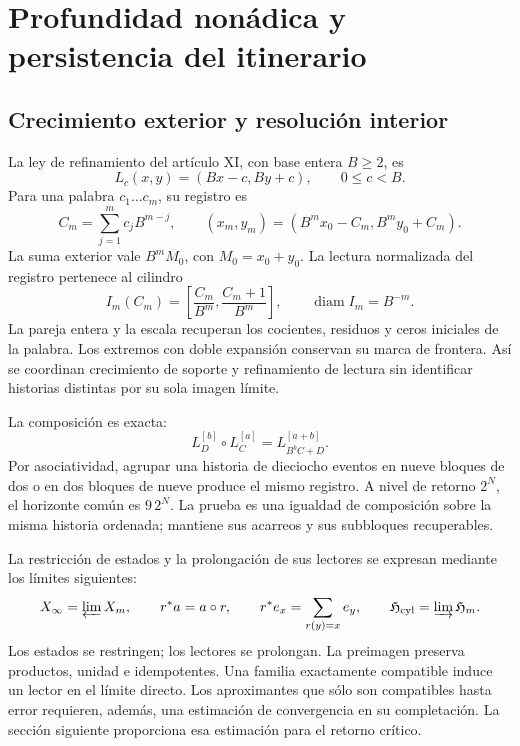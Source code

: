 \section{Profundidad nonádica y persistencia del itinerario}
\label{hmtfg:fragmento:profundidad-nonadica-y-persistencia-del-itinerario}

\subsection{Crecimiento exterior y resolución interior}
\label{hmtfg:prolongacion:2}

La ley de refinamiento del artículo XI, con base entera \(B\ge2\), es
\[
L_c(x,y)=(Bx-c,By+c),\qquad 0\le c<B.
\]
Para una palabra \(c_1\ldots c_m\), su registro es
\[
C_m=\sum_{j=1}^m c_jB^{m-j},\qquad
(x_m,y_m)=(B^mx_0-C_m,B^my_0+C_m).
\]
La suma exterior vale \(B^mM_0\), con \(M_0=x_0+y_0\). La lectura normalizada del registro pertenece al cilindro
\[
I_m(C_m)=\left[\frac{C_m}{B^m},\frac{C_m+1}{B^m}\right],
\qquad \operatorname{diam}I_m=B^{-m}.
\]
La pareja entera y la escala recuperan los cocientes, residuos y ceros iniciales de la palabra. Los extremos con doble expansión conservan su marca de frontera. Así se coordinan crecimiento de soporte y refinamiento de lectura sin identificar historias distintas por su sola imagen límite.

La composición es exacta:
\[
L_D^{[b]}\circ L_C^{[a]}=L_{B^bC+D}^{[a+b]}.
\]
Por asociatividad, agrupar una historia de dieciocho eventos en nueve bloques de dos o en dos bloques de nueve produce el mismo registro. A nivel de retorno \(2^N\), el horizonte común es \(9\,2^N\). La prueba es una igualdad de composición sobre la misma historia ordenada; mantiene sus acarreos y sus subbloques recuperables.

La restricción de estados y la prolongación de sus lectores se expresan mediante los límites siguientes:
\[
X_\infty=\varprojlim X_m,\qquad
r^*a=a\circ r,\qquad
r^*e_x=\sum_{r(y)=x}e_y,
\qquad \mathfrak H_{\rm cyl}=\varinjlim\mathfrak H_m.
\]
Los estados se restringen; los lectores se prolongan. La preimagen preserva productos, unidad e idempotentes. Una familia exactamente compatible induce un lector en el límite directo. Los aproximantes que sólo son compatibles hasta error requieren, además, una estimación de convergencia en su completación. La sección siguiente proporciona esa estimación para el retorno crítico.

